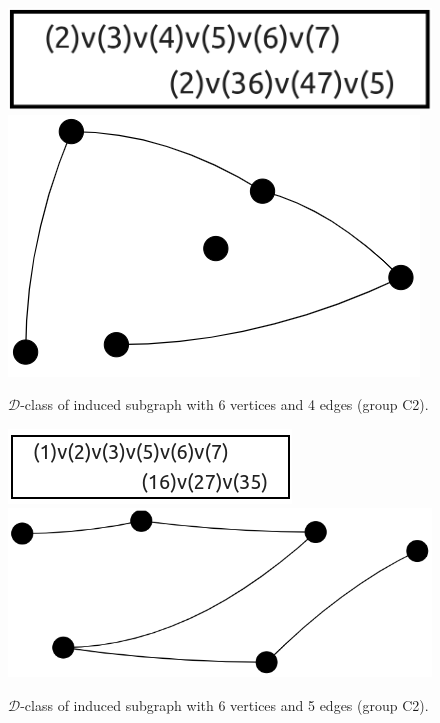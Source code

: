 \begin{appendices}
\begin{figure}[H]
\includegraphics[scale=0.1]{images/x9/x9_6v_4e_3.png}
\includegraphics[scale=0.1]{images/x9/x9_6v_4e_3_vis.png}
\caption{$\mathcal{D}$-class of induced subgraph with 6 vertices and 4 edges (group C2).}
\end{figure}

\begin{figure}[H]
\includegraphics[scale=0.35]{images/x9/x9_6v_5e_1.png}
\includegraphics[scale=0.1]{images/x9/x9_6v_5e_1_vis.png}
\caption{$\mathcal{D}$-class of induced subgraph with 6 vertices and 5 edges (group C2).}
\end{figure}


\end{appendices}
